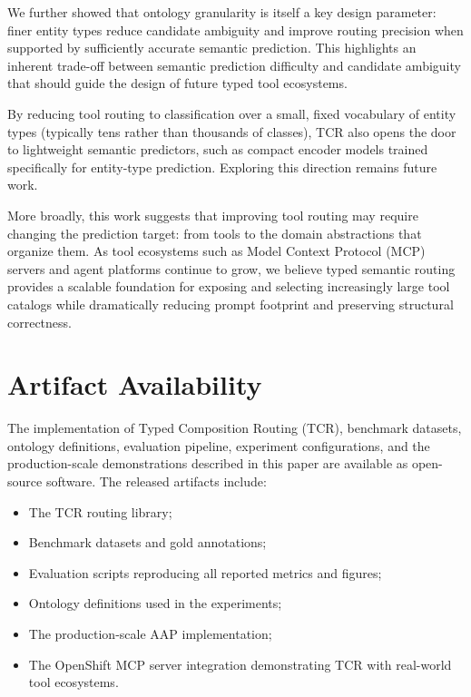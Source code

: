 \documentclass{article}
\begin{document}
We further showed that ontology granularity is itself a key design parameter: finer entity types reduce candidate ambiguity and improve routing precision when supported by sufficiently accurate semantic prediction. This highlights an inherent trade-off between semantic prediction difficulty and candidate ambiguity that should guide the design of future typed tool ecosystems.

By reducing tool routing to classification over a small, fixed vocabulary of entity types (typically tens rather than thousands of classes), TCR also opens the door to lightweight semantic predictors, such as compact encoder models trained specifically for entity-type prediction. Exploring this direction remains future work.

More broadly, this work suggests that improving tool routing may require changing the prediction target: from tools to the domain abstractions that organize them. As tool ecosystems such as Model Context Protocol (MCP) servers and agent platforms continue to grow, we believe typed semantic routing provides a scalable foundation for exposing and selecting increasingly large tool catalogs while dramatically reducing prompt footprint and preserving structural correctness.


\section*{Artifact Availability}

The implementation of Typed Composition Routing (TCR), benchmark datasets, ontology definitions, evaluation pipeline, experiment configurations, and the production-scale demonstrations described in this paper are available as open-source software. The released artifacts include:

\begin{itemize}[leftmargin=*,nosep]
  \item The TCR routing library;
  \item Benchmark datasets and gold annotations;
  \item Evaluation scripts reproducing all reported metrics and figures;
  \item Ontology definitions used in the experiments;
  \item The production-scale AAP implementation;
  \item The OpenShift MCP server integration demonstrating TCR with real-world tool ecosystems.
\end{itemize}
\end{document}
